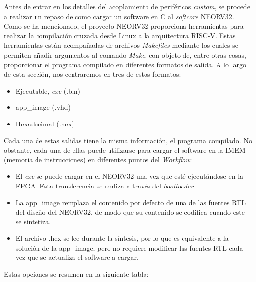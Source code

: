 Antes de entrar en los detalles del acoplamiento de periféricos \textit{custom}, se procede a realizar un repaso de como cargar un software en C al \textit{softcore} NEORV32.
Como se ha mencionado, el proyecto NEORV32 proporciona herramientas para realizar la compilación cruzada desde Linux a la arquitectura RISC-V.
Estas herramientas están acompañadas de archivos \textit{Makefiles} mediante los cuales se permiten añadir argumentos al comando \textit{Make}, con objeto de, entre otras cosas, proporcionar el programa compilado en diferentes formatos de salida.
A lo largo de esta sección, nos centraremos en tres de estos formatos:

\begin{itemize}
    \item Ejecutable, \textit{exe} (.bin)
    \item app\_image (.vhd)
    \item Hexadecimal (.hex)
\end{itemize} 

Cada una de estas salidas tiene la misma información, el programa compilado.
No obstante, cada una de ellas puede utilizarse para cargar el software en la IMEM (memoria de instrucciones) en diferentes puntos del \textit{Workflow}:

\begin{itemize}
    \item El \textit{exe} se puede cargar en el NEORV32 una vez que esté ejecutándose en la FPGA. Esta transferencia se realiza a través del \textit{bootloader}.
    \item La app\_image remplaza el contenido por defecto de una de las fuentes RTL del diseño del NEORV32, de modo que su contenido se codifica cuando este se sintetiza.
    \item El archivo .hex se lee durante la síntesis, por lo que es equivalente a la solución de la app\_image, pero no requiere modificar las fuentes RTL cada vez que se actualiza el software a cargar.
\end{itemize} 

Estas opciones se resumen en la siguiente tabla:


